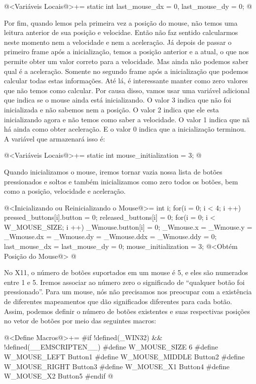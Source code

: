 \iniciocodigo
@<Variáveis Locais@>+=
static int last_mouse_dx = 0, last_mouse_dy = 0;
@
\fimcodigo

Por fim, quando lemos pela primeira vez a posição do mouse, não temos
uma leitura anterior de sua posição e velocidae. Então não faz sentido
calcularmos neste momento nem a velocidade e nem a aceleração. Já
depois de passar o primeiro frame após a inicialização, temos a
posição anterior e a atual, o que nos permite obter um valor correto
para a velocidade. Mas ainda não podemos saber qual é a
aceleração. Somente no segundo frame após a inicialização que podemos
calcular todas estas informações. Até lá, é interessante manter como
zero valores que não temos como calcular. Por causa disso, vamos usar
uma variável adicional que indica se o mouse ainda está
inicializando. O valor 3 indica que não foi inicializada e não sabemos
nem a posição. O valor 2 indica que ele esta inicializando agora e não
temos como saber a velocidade. O valor 1 indica que nã há ainda como
obter aceleração. E o valor 0 indica que a inicialização terminou. A
variável que armazenará isso é:

\iniciocodigo
@<Variáveis Locais@>+=
static int mouse_initialization = 3;
@
\fimcodigo

Quando inicializamos o mouse, iremos tornar vazia nossa lista de
botões pressionados e soltos e também inicializamos como zero todos os
botões, bem como a posição, velocidade e aceleração.

\iniciocodigo
@<Inicializando ou Reinicializando o Mouse@>=
{
  int i;
  for(i = 0; i < 4; i ++){
    pressed_buttons[i].button = 0;
    released_buttons[i] = 0;
  }
  for(i = 0; i < W_MOUSE_SIZE; i ++)
    _Wmouse.button[i] = 0;
  _Wmouse.x = _Wmouse.y = _Wmouse.dx = _Wmouse.dy = _Wmouse.ddx = _Wmouse.ddy = 0;
  last_mouse_dx = last_mouse_dy = 0;
  mouse_initialization = 3;
  @<Obtém Posição do Mouse@>
}
@
\fimcodigo


No X11, o número de botões suportados em um mouse é 5, e eles são
numerados entre 1 e 5. Iremos associar ao número zero o significado de
``qualquer botão foi pressionado''. Para um mouse, nós não precisamos
nos preocupar com a existência de diferentes mapeamentos que dão
significados diferentes para cada botão. Assim, podemos definir o
número de botões existentes e suas respectivas posições no vetor de
botões por meio das seguintes macros:

\iniciocodigo
@<Define Macros@>+=
#if !defined(_WIN32) && !defined(__EMSCRIPTEN__)
#define W_MOUSE_SIZE 6
#define W_MOUSE_LEFT   Button1
#define W_MOUSE_MIDDLE Button2
#define W_MOUSE_RIGHT  Button3
#define W_MOUSE_X1     Button4
#define W_MOUSE_X2     Button5
#endif
@
\fimcodigo

